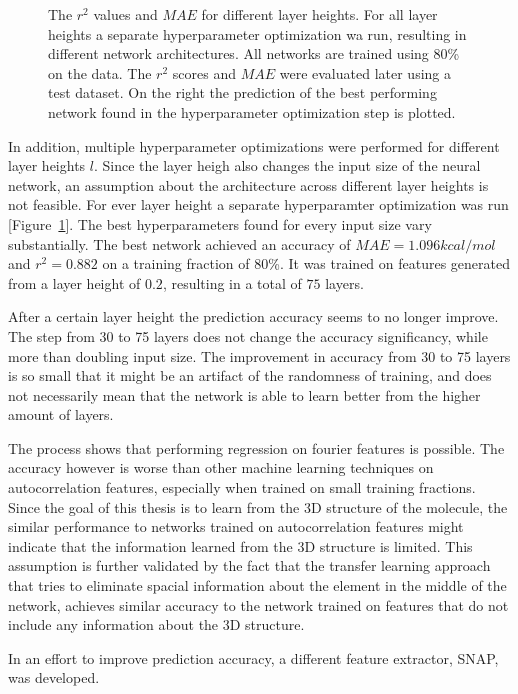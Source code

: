 \begin{figure}[!htb]
    \endminipage
    \caption[Evaluation of LEFD models]{
    The $r^2$ values and $MAE$ for different layer heights.
    For all layer heights a separate hyperparameter optimization wa run, resulting in different network architectures.
    All networks are trained using 80\% on the data. The $r^2$ scores and $MAE$ were evaluated later using a test dataset.
    On the right the prediction of the best performing network found in the hyperparameter optimization step is plotted.
    }
    \label{fig:fourier_final}
\end{figure}


In addition, multiple hyperparameter optimizations were performed for different layer heights $l$.
Since the layer heigh also changes the input size of the neural network, an assumption about the 
architecture across different layer heights is not feasible.
For ever layer height a separate hyperparamter optimization was run [Figure~\ref{fig:fourier_final}].
The best hyperparameters found for every input size vary substantially.
The best network achieved an accuracy of $MAE=1.096 kcal/mol$ and $r^2=0.882$ on a training fraction of 80\%.
It was trained on features generated from a layer height of $0.2$, resulting in a total of $75$ layers.

After a certain layer height the prediction accuracy seems to no longer improve.
The step from 30 to 75 layers does not change the accuracy significancy, while more than doubling input size.
The improvement in accuracy from 30 to 75 layers is so small that it might be an artifact of the 
randomness of training, and does not necessarily mean that the network is able to learn better from the higher amount of layers.

The process shows that performing regression on fourier features is possible.
The accuracy however is worse than other machine learning techniques on autocorrelation features, especially when trained on small training fractions.
Since the goal of this thesis is to learn from the 3D structure of the molecule, the similar performance to networks trained on autocorrelation features
might indicate that the information learned from the 3D structure is limited.
This assumption is further validated by the fact that the transfer learning approach that 
tries to eliminate spacial information about the element in the middle of the network, achieves similar accuracy to the 
network trained on features that do not include any information about the 3D structure.

In an effort to improve prediction accuracy, a different feature extractor, SNAP, was developed.

